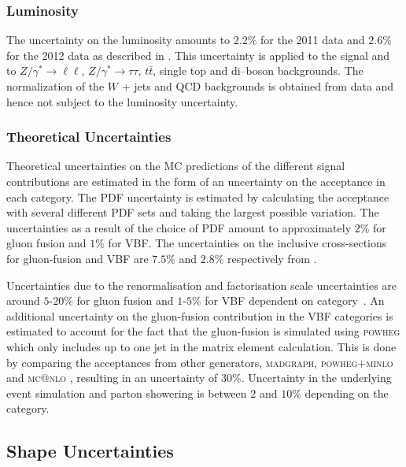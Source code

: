 \subsubsection{\textbf{Luminosity}} 
The uncertainty on the luminosity amounts to $2.2\%$ for the 2011 data and
$2.6\%$ for the 2012 data as described in \cite{CMS-PAS-SMP-12-008,CMS-PAS-LUM-13-001}.
This uncertainty is applied to the signal and to $Z/\gamma^{*} \to \ell\ell$, $Z/\gamma^{*} \to
\tau\tau$, $t \bar{t}$, single top and di--boson backgrounds. 
The normalization of the $W$ + jets and QCD backgrounds is obtained from data and hence not subject to the luminosity uncertainty.

\subsubsection{\textbf{Theoretical Uncertainties}} 
Theoretical uncertainties on the \ac{MC} predictions of the different signal
contributions are estimated in the form of an uncertainty on the acceptance in
each category. The \ac{PDF} uncertainty is estimated by calculating the
acceptance with several different \ac{PDF} sets and taking the largest possible
variation. The uncertainties as a result of the choice of \ac{PDF} amount to
approximately $2\%$ for gluon fusion and $1\%$ for \ac{VBF}. The uncertainties
on the inclusive cross-sections for gluon-fusion and \ac{VBF} are $7.5\%$ and
$2.8\%$ respectively from
\cite{LHCHiggsCrossSectionWorkingGroup:2011ti,Dittmaier:2012vm,Heinemeyer:2013tqa}.

Uncertainties due to the renormalisation and factorisation scale uncertainties
are around $5$-$20\%$ for gluon fusion and $1$-$5\%$ for \ac{VBF} dependent on
category~\cite{HIG-13-004}. An additional uncertainty on the gluon-fusion contribution in the
VBF categories is estimated to account for the fact that the gluon-fusion is
simulated using \textsc{powheg} which only includes up to one jet in the matrix
element calculation. This is done by comparing the acceptances from other
generators, \textsc{madgraph}, \textsc{powheg+minlo} \cite{Hamilton:2012np} and
\textsc{mc@nlo} \cite{Frixione:2002ik}, resulting in an uncertainty of $30\%$.
Uncertainty in the underlying event simulation and parton showering is between
$2$ and $10\%$ depending on the category. 


\subsection{Shape Uncertainties}
\label{sec:systematicUncertainties_shape}

